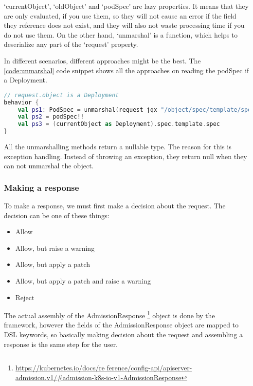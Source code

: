 `currentObject', `oldObject' and `podSpec' are lazy properties. It means that they are only evaluated, if you use them, so they will not cause an error if the field they reference does not exist, and they will also not waste processing time if you do not use them. On the other hand, `unmarshal' is a function, which helps to deserialize any part of the `request' property.

In different scenarios, different approaches might be the best. The \ref{code:unmarshal} code snippet shows all the approaches on reading the podSpec if a Deployment.

\begin{lstlisting}[caption={Unmarshalling},language=Kotlin,label=code:unmarshal]
// request.object is a Deployment
behavior {
    val ps1: PodSpec = unmarshal(request jqx "/object/spec/template/spec")!!
    val ps2 = podSpec!!
    val ps3 = (currentObject as Deployment).spec.template.spec
}
\end{lstlisting}

All the unmarshalling methods return a nullable type. The reason for this is exception handling. Instead of throwing an exception, they return null when they can not unmarshal the object.

\subsubsection{Making a response}

To make a response, we must first make a decision about the request. The decision can be one of these things:

\begin{itemize}
    \item Allow
    \item Allow, but raise a warning
    \item Allow, but apply a patch
    \item Allow, but apply a patch and raise a warning
    \item Reject
\end{itemize}

The actual assembly of the AdmissionResponse
\footnote{\url{https://kubernetes.io/docs/re  ference/config-api/apiserver-admission.v1/\#admission-k8s-io-v1-AdmissionResponse}}
object is done by the framework, however the fields of the AdmissionResponse object are mapped to DSL keywords, so basically making decision about the request and assembling a response is the same step for the user. 

